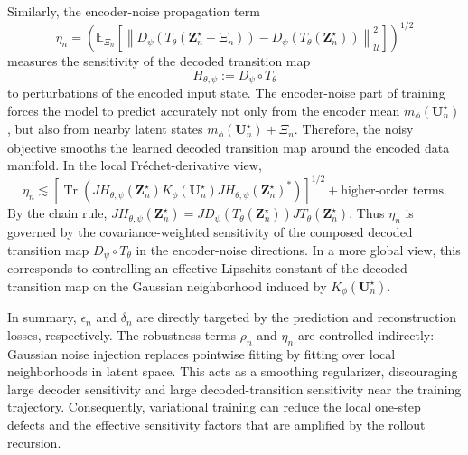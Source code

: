 \documentclass[11pt]{article}
\begin{document}
\begin{remark}
Similarly, the encoder-noise propagation term
\[
    \eta_n
    =
    \left(
    \mathbb E_{\Xi_n}
    \left[
    \left\|
    D_\psi(T_\theta(\mathbf Z_n^\star+\Xi_n))
    -
    D_\psi(T_\theta(\mathbf Z_n^\star))
    \right\|_{\mathcal U}^2
    \right]
    \right)^{1/2}
\]
measures the sensitivity of the decoded transition map
\[
    H_{\theta,\psi}:=D_\psi\circ T_\theta
\]
to perturbations of the encoded input state. The encoder-noise part of training forces the model to
predict accurately not only from the encoder mean
$m_\phi(\mathbf U_n^\star)$, but also from nearby latent states
$m_\phi(\mathbf U_n^\star)+\Xi_n$. Therefore, the noisy objective smooths the learned decoded
transition map around the encoded data manifold. In the local Fr\'echet-derivative view,
\[
    \eta_n
    \lesssim
    \left[
    \operatorname{Tr}
    \left(
    JH_{\theta,\psi}(\mathbf Z_n^\star)
    K_\phi(\mathbf U_n^\star)
    JH_{\theta,\psi}(\mathbf Z_n^\star)^\ast
    \right)
    \right]^{1/2}
    +
    \text{higher-order terms}.
\]
By the chain rule, $JH_{\theta,\psi}(\mathbf Z_n^\star)= JD_\psi(T_\theta(\mathbf Z_n^\star))JT_\theta(\mathbf Z_n^\star)$.
Thus $\eta_n$ is governed by the covariance-weighted sensitivity of the composed decoded transition map $D_\psi\circ T_\theta$ in the encoder-noise directions. In a more global view, this
corresponds to controlling an effective Lipschitz constant of the decoded transition map on the Gaussian neighborhood induced by $K_\phi(\mathbf U_n^\star)$.

In summary, $\epsilon_n$ and $\delta_n$ are directly targeted by the prediction and reconstruction losses, respectively. The robustness terms $\rho_n$ and $\eta_n$ are controlled indirectly: Gaussian noise injection replaces pointwise fitting by fitting over local neighborhoods in latent space. This acts as a smoothing regularizer, discouraging large decoder sensitivity and large decoded-transition sensitivity near the training trajectory. Consequently, variational training can reduce the local one-step defects and the effective sensitivity factors that are amplified by the rollout recursion.
\end{remark}
\end{document}
